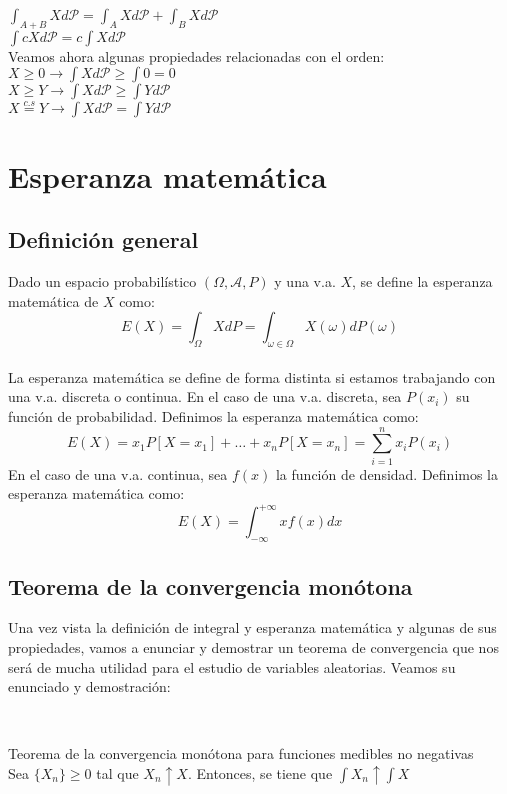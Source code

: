 \documentclass[12pt,a4paper]{book}
\begin{document}
$\displaystyle \int_{A+B} X d\mathcal{P} = \int_A X d\mathcal{P} + \int_B X d \mathcal{P}$\\

$\displaystyle \int cXd\mathcal{P} = c\int Xd\mathcal{P}$\\

Veamos ahora algunas propiedades relacionadas con el orden:\\

$X \geq 0 \rightarrow \displaystyle \int X d\mathcal{P} \geq \int 0 = 0$\\

$X \geq Y \rightarrow \displaystyle \int X d\mathcal{P} \geq \int Y d\mathcal{P}$\\

$\displaystyle X \stackrel{c.s}{=} Y \rightarrow \int X d\mathcal{P} = \int Y d\mathcal{P}$\\

\section{Esperanza matemática}

\subsection{Definición general}

Dado un espacio probabilístico $(\Omega, \mathcal{A}, P)$ y una v.a. $X$, se define la esperanza matemática de $X$ como:
$$E(X)=\int_{\Omega}XdP=\int_{\omega \in \Omega}{X(\omega)dP(\omega)}$$
\\

La esperanza matemática se define de forma distinta si estamos trabajando con una v.a. discreta o continua. En el caso de una v.a. discreta, sea $P(x_i)$ su función de probabilidad. Definimos la esperanza matemática como:
$$E(X)=x_1P[X=x_1]+\ldots + x_n P[X=x_n]=\sum_{i=1}^{n}{x_i P(x_i)}$$
En el caso de una v.a. continua, sea $f(x)$ la función de densidad. Definimos la esperanza matemática como:
$$E(X)=\int_{-\infty}^{+\infty} {xf(x)dx}$$

\subsection{Teorema de la convergencia monótona}

Una vez vista la definición de integral y esperanza matemática y algunas de sus propiedades, vamos a enunciar y demostrar un teorema de convergencia que nos será de mucha utilidad para el estudio de variables aleatorias. Veamos su enunciado y demostración:
\begin{theorem}
	\
	
Teorema de la convergencia monótona para funciones medibles no negativas\\

Sea $\{X_n\} \geq 0$ tal que $X_n \uparrow X$. Entonces, se tiene que $\displaystyle \int X_n \uparrow \int X$
\end{theorem}
\end{document}

